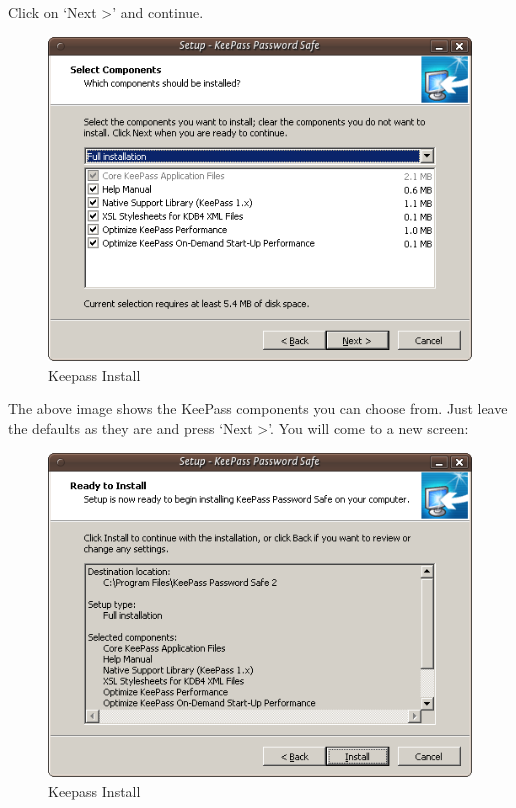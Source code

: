 Click on `Next \textgreater{}' and continue.

\begin{figure}[htbp]
\centering
\includegraphics{keepass_6.png}
\caption{Keepass Install}
\end{figure}

The above image shows the KeePass components you can choose from. Just
leave the defaults as they are and press `Next \textgreater{}'. You will
come to a new screen:

\begin{figure}[htbp]
\centering
\includegraphics{keepass_7.png}
\caption{Keepass Install}
\end{figure}

